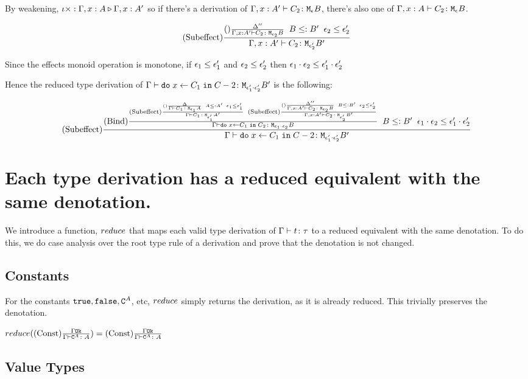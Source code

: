 {    By weakening, $\wrel{\i\x}{\G, x:A}{\G, x: A'}$ so if there's a derivation of $\typerelation{\G, x:A'}{C_2}{\meb}$, there's also one of   $\typerelation{\gax}{C_2}{\meb}$.

    \begin{equation}
        \deltacruleprimeprime{\G, x:A'}{C_2}{\e_2}{B}{\e_2'}{B'}
    \end{equation}

    Since the effects monoid operation is monotone, if $\e_1\subeffect\e_1'$ and $\e_2\subeffect\e_2'$ then $\e_1\dot\e_2 \subeffect \e_1'\dot\e_2'$

    Hence the reduced type derivation of $\gtyperelation{\doin{x}{C_1}{C-2}}{\M{\e_1'\dot\e_2'}{B'}}$ is the following:

    \begin{equation}
        \treerule{Subeffect} {
            \treerule{Bind}{
                \deltacrule{\G}{C_1}{\e_1}{A}{\e_1'}{A'}
                \s\s
                \deltacruleprimeprime{\G, x:A'}{C_2}{\e_2}{B}{\e_2'}{B'}
            } {
                \gtyperelation{\doin{x}{C_1}{C_2}}{\M{\e_1\dot\e_2}{B}}
            }
            \s\s
            B\subtype B'
            \s\s
            \e_1\dot\e_2\subeffect\e_1'\dot\e_2'
        } {
            \gtyperelation{\doin{x}{C_1}{C-2}}{\M{\e_1'\dot\e_2'}{B'}}
        }
    \end{equation}

    \section{Each type derivation has a reduced equivalent with the same denotation.}
    We introduce a function, $\reduce$ that maps each valid type derivation of $\gtyperelation{t}{\tau}$ to a reduced equivalent with the same denotation. To do this, we do case analysis over the root type rule of a derivation and prove that the denotation is not changed.

        \subsection{Constants}
            For the constants $\t, \f, \const{A}$, etc, $\reduce$ simply returns the derivation, as it is already reduced. This trivially preserves the denotation.

            $\reduce(\truleconst) = \truleconst$

        \subsection{Value Types}
}
